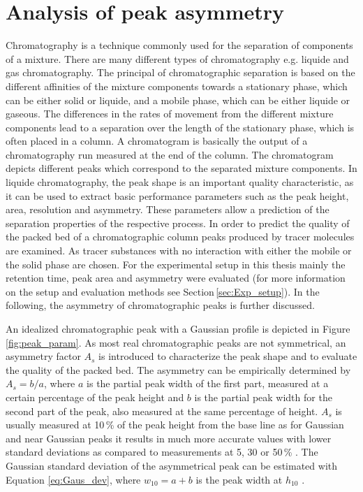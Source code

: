 \section{Analysis of peak asymmetry}
\label{sec:peak_as}
Chromatography is a technique commonly used for the separation of components of a mixture. There are many different types of chromatography e.g. liquide and gas chromatography. The principal of chromatographic separation is based on the different affinities of the mixture components towards a stationary phase, which can be either solid or liquide, and a mobile phase, which can be either liquide or gaseous. The differences in the rates of movement from the different mixture components lead to a separation over the length of the stationary phase, which is often placed in a column. A chromatogram is basically the output of a chromatography run measured at the end of the column. The chromatogram depicts different peaks which correspond to the separated mixture components. In liquide chromatography, the peak shape is an important quality characteristic, as it can be used to extract basic performance parameters such as the peak height, area, resolution and asymmetry. These parameters allow a prediction of the separation properties of the respective process. In order to predict the quality of the packed bed of a chromatographic column peaks produced by tracer molecules are examined. As tracer substances with no interaction with either the mobile or the solid phase are chosen. For the experimental setup in this thesis mainly the retention time, peak area and asymmetry were evaluated (for more information on the setup and evaluation methods see Section\,\ref{sec:Exp_setup}). In the following, the asymmetry of chromatographic peaks is further discussed. 
 
An idealized chromatographic peak with a Gaussian profile is depicted in Figure\,\ref{fig:peak_param}. As most real chromatographic peaks are not symmetrical, an asymmetry factor $A_{s}$ is introduced to characterize the peak shape and to evaluate the quality of the packed bed. The asymmetry can be empirically determined by $A_{s}=b/a$, where $a$ is the partial peak width of the first part, measured at a certain percentage of the peak height and $b$ is the partial peak width for the second part of the peak, also measured at the same percentage of height. $A_{s}$ is usually measured at 10\,\% of the peak height from the base line as for Gaussian and near Gaussian peaks it results in much more accurate values with lower standard deviations as compared to measurements at 5, 30 or 50\,\% \cite{foley1983equations}. The Gaussian standard deviation of the asymmetrical peak can be estimated with Equation \ref{eq:Gaus_dev}, where $w_{10}=a+b$ is the peak width at $h_{10}$ \cite{papai2002analysis}.  

